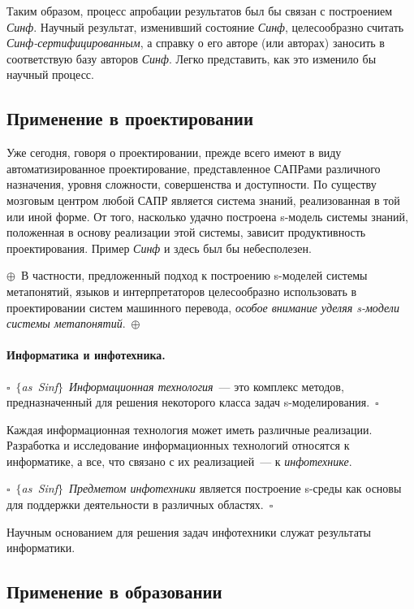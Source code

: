 \begin{multicols}{2}
Таким образом, процесс апробации результатов был бы связан с построением
\textit{Синф}. Научный результат, изменивший состояние \textit{Синф}, целесообразно
считать \textit{Синф-сертифицированным}, а справку о его авторе (или
авторах) заносить в соответствую базу авторов \textit{Синф}. Легко
представить, как это изменило бы научный процесс.

\subsection{Применение в проектировании } %

Уже сегодня, говоря о проектировании, прежде всего имеют в виду
автоматизированное проектирование, представленное САПРами различного
назначения, уровня сложности, совершенства и доступности. По существу
мозговым центром любой САПР является система знаний, реализованная в той
или иной форме. От того, насколько удачно построена s-модель системы
знаний, положенная в основу реализации этой системы, зависит
продуктивность проектирования. Пример \textit{Синф} и здесь был бы
небесполезен.

\noindent
$\oplus$~В частности, предложенный подход к построению
s-моделей системы метапонятий, языков и интерпретаторов целесообразно
использовать в проектировании систем машинного перевода, \textit{особое
внимание уделяя s-модели системы метапонятий}.~$\oplus$

\paragraph*{Информатика и инфотехника.}$\square$~$\{$\textit{as~Sinf}$\}$~\textit{Информационная технология}~---
это комплекс методов, предназначенный для решения некоторого класса задач
s-моделирования.~$\square$

Каждая информационная технология может иметь
различные реализации. Разработка и исследование информационных
технологий относятся к информатике, а все, что связано с их реализацией~--- к
\textit{инфотехнике}.

\noindent
$\square$~$\{$\textit{as~Sinf}$\}$~\textit{Предметом инфотехники} является
построение s-среды как основы для поддержки деятельности в различных
областях.~$\square$

Научным основанием для решения задач инфотехники
служат результаты информатики.

\subsection{Применение в образовании} %


\end{multicols}
